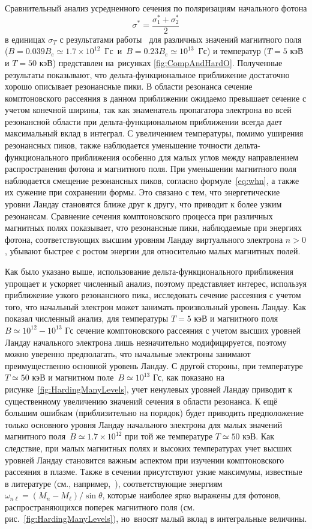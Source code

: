 Сравнительный анализ усредненного сечения по поляризациям начального фотона
\begin{equation}
	\sigma^*=\frac{\sigma^*_{1}+\sigma^*_{2}}{2}
\end{equation}
в единицах $\sigma_T$ с результатами работы~\cite{Harding:1991} для различных значений магнитного поля (\mbox{$B=0.039B_e\simeq1.7\times10^{12}$ Гс и $B=0.23B_e\simeq10^{13}$ Гс}) и температур ($T=5$ кэВ и $T=50$ кэВ) представлен на~рисунках \ref{fig:CompAndHardO}. Полученные результаты показывают, что дельта-функциональное приближение достаточно хорошо описывает резонансные пики. В области резонанса сечение комптоновского рассеяния в данном приближении ожидаемо превышает сечение с учетом конечной ширины, так как знаменатель пропагатора электрона во всей резонансной области при дельта-функциональном приближении всегда дает максимальный вклад в интеграл. С увеличением температуры, помимо уширения резонансных пиков, также наблюдается уменьшение точности дельта-функционального приближения особенно для малых углов между направлением распространения фотона и магнитного поля. При уменьшении магнитного поля наблюдается смещение резонансных пиков, согласно формуле~\ref{eq:whn}, а также их сужение при сохранении формы. Это связано с тем, что энергетические уровни Ландау становятся ближе друг к другу, что приводит к более узким резонансам.   Сравнение сечения комптоновского процесса при различных магнитных полях показывает, что резонансные пики, наблюдаемые при энергиях фотона, соответствующих высшим уровням Ландау виртуального электрона $n>0$, убывают быстрее с ростом энергии для относительно малых магнитных полей.

Как было указано выше, использование дельта-функционального приближения упрощает и ускоряет численный анализ, поэтому представляет интерес, используя приближение узкого резонансного пика, исследовать сечение рассеяния с учетом того, что начальный электрон может занимать произвольный уровень Ландау. Как показал численный анализ, для температуры $T=5$ кэВ и магнитного поля $B\simeq10^{12}-10^{13}$ Гс сечение комптоновского рассеяния с учетом высших уровней Ландау начального электрона лишь незначительно модифицируется, поэтому можно уверенно предполагать, что начальные электроны занимают преимущественно основной уровень Ландау. С другой стороны, при температуре $T\simeq50$ кэВ и магнитном поле~$B\simeq 10^{13}$ Гс, как показано на рисунке~\ref{fig:HardingManyLevels}, учет ненулевых уровней Ландау приводит к существенному увеличению значений сечения в области резонанса. К ещё большим ошибкам (приблизительно на порядок)  будет приводить предположение только основного уровня Ландау начального электрона для малых значений магнитного поля~$B\simeq1.7\times10^{12}$ при той же температуре $T\simeq50$ кэВ.  Как следствие, при малых магнитных полях и высоких температурах учет высших уровней Ландау становится важным аспектом при изучении комптоновского рассеяния в плазме. Также в сечении присутствуют узкие максимумы, известные в литературе (см., например,~\cite{Pavlov:1991,Klepikov:1954,Baier:2007}), соответствующие энергиям $\omega_{n\ell}=(M_n-M_\ell)/\sin \theta$, которые наиболее ярко выражены для фотонов, распространяющихся поперек магнитного поля (см.~ рис.~\ref{fig:HardingManyLevels}), но~вносят малый вклад в интегральные величины.

